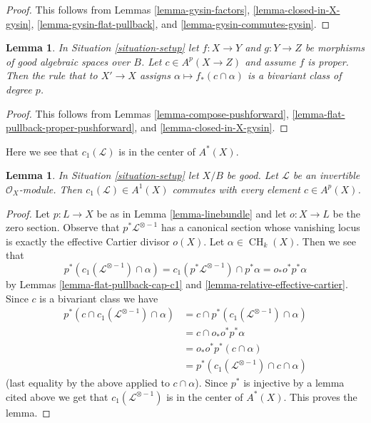 \documentclass{stacks-project}
\theoremstyle{plain}
\newtheorem{lemma}[subsection]{Lemma}
\theoremstyle{definition}
\theoremstyle{remark}
\numberwithin{equation}{subsection}
\def\CH{\mathop{\mathrm{CH}}\nolimits}
\begin{document}
\begin{proof}
This follows from Lemmas \ref{lemma-gysin-factors},
\ref{lemma-closed-in-X-gysin},
\ref{lemma-gysin-flat-pullback}, and
\ref{lemma-gysin-commutes-gysin}.
\end{proof}

\begin{lemma}
\label{lemma-push-proper-bivariant}
In Situation \ref{situation-setup} let $f : X \to Y$ and
$g : Y \to Z$ be morphisms of good algebraic spaces over $B$.
Let $c \in A^p(X \to Z)$ and assume $f$ is proper.
Then the rule that to $X' \to X$ assigns
$\alpha \longmapsto f_*(c \cap \alpha)$
is a bivariant class of degree $p$.
\end{lemma}

\begin{proof}
This follows from Lemmas \ref{lemma-compose-pushforward},
\ref{lemma-flat-pullback-proper-pushforward}, and
\ref{lemma-closed-in-X-gysin}.
\end{proof}

\noindent
Here we see that $c_1(\mathcal{L})$ is in the center of $A^*(X)$.

\begin{lemma}
\label{lemma-c1-center}
In Situation \ref{situation-setup} let $X/B$ be good.
Let $\mathcal{L}$ be an invertible $\mathcal{O}_X$-module.
Then $c_1(\mathcal{L}) \in A^1(X)$ commutes with every
element $c \in A^p(X)$.
\end{lemma}

\begin{proof}
Let $p : L \to X$ be as in Lemma \ref{lemma-linebundle} and let $o : X \to L$
be the zero section. Observe that $p^*\mathcal{L}^{\otimes -1}$ has a
canonical section whose vanishing locus is exactly the
effective Cartier divisor $o(X)$. Let $\alpha \in \CH_k(X)$. Then we see that
$$
p^*(c_1(\mathcal{L}^{\otimes -1}) \cap \alpha) =
c_1(p^*\mathcal{L}^{\otimes -1}) \cap p^*\alpha =
o_* o^* p^*\alpha
$$
by Lemmas \ref{lemma-flat-pullback-cap-c1} and
\ref{lemma-relative-effective-cartier}.
Since $c$ is a bivariant class we have
\begin{align*}
p^*(c \cap c_1(\mathcal{L}^{\otimes -1}) \cap \alpha)
& =
c \cap p^*(c_1(\mathcal{L}^{\otimes -1}) \cap \alpha) \\
& =
c \cap o_* o^* p^*\alpha \\
& =
o_* o^* p^*(c \cap \alpha) \\
& =
p^*(c_1(\mathcal{L}^{\otimes -1}) \cap c \cap \alpha)
\end{align*}
(last equality by the above applied to $c \cap \alpha$).
Since $p^*$ is injective by a lemma cited above we get that
$c_1(\mathcal{L}^{\otimes -1})$
is in the center of $A^*(X)$. This proves the lemma.
\end{proof}
\end{document}
